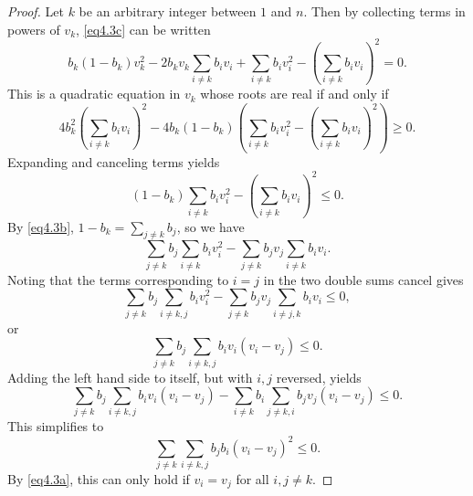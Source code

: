 \begin{proof}
    Let \( k \) be an arbitrary integer between \( 1 \) and \( n \). Then by collecting terms in powers of \( v_k \), \eqref{eq4.3c} can be written
\begin{equation*}
    b_{k}(1-b_{k})v_{k}^{2} - 2b_{k}v_{k}\sum_{i \neq k}b_{i}v_{i} + \sum_{i \neq k}b_{i}v_{i}^{2} - \left(\sum_{i \neq k}b_{i}v_{i}\right)^{2} = 0.
\end{equation*}
This is a quadratic equation in \( v_{k} \) whose roots are real if and only if
\begin{equation*}
    4b_{k}^{2}\left(\sum_{i \neq k}b_{i}v_{i}\right)^{2} - 4b_{k}(1-b_{k})\left(\sum_{i \neq k}b_{i}v_{i}^{2} - \left(\sum_{i \neq k}b_{i}v_{i}\right)^{2}\right) \geq 0.
\end{equation*}
Expanding and canceling terms yields
\begin{equation*}
    (1-b_{k})\sum_{i \neq k}b_{i}v_{i}^{2} - \left(\sum_{i \neq k}b_{i}v_{i} \right)^{2} \leq 0.
\end{equation*}
By \eqref{eq4.3b}, \( 1-b_{k} = \sum_{j \ne k}b_{j} \), so we have
\begin{equation*}
    \sum_{j \neq k}b_{j}\sum_{i \neq k}b_{i}v_{i}^{2} - \sum_{j \neq k}b_{j}v_{j}\sum_{i \neq k}b_{i}v_{i}.
\end{equation*}
Noting that the terms corresponding to \( i = j \) in the two double sums cancel gives
\begin{equation*}
    \sum_{j \neq k}b_{j}\sum_{i \neq k,j}b_{i}v_{i}^{2} - \sum_{j \neq k}b_{j}v_{j}\sum_{i \neq j,k}b_{i}v_{i} \leq 0,
\end{equation*}
or
\begin{equation*}
    \sum_{j \neq k}b_{j}\sum_{i \neq k,j}b_{i}v_{i}(v_{i} - v_{j}) \leq 0.
\end{equation*}
Adding the left hand side to itself, but with \( i,j \) reversed, yields
\begin{equation*}
    \sum_{j \neq k}b_{j}\sum_{i \neq k,j}b_{i}v_{i}(v_{i} - v_{j}) - \sum_{i \neq k}b_{i}\sum_{j \neq k,i}b_{j}v_{j}(v_{i} - v_{j}) \leq 0.
\end{equation*}
This simplifies to
\begin{equation*}
    \sum_{j \neq k}\sum_{i \neq k,j}b_{j}b_{i}(v_{i} - v_{j})^{2} \leq 0.
\end{equation*}
By \eqref{eq4.3a}, this can only hold if \( v_{i} = v_{j} \) for all \( i,j \neq k \).
\end{proof}

